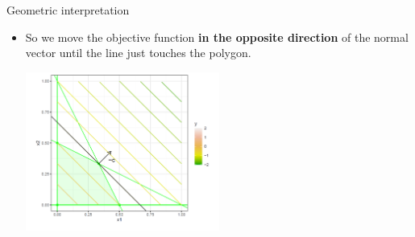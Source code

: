 \begin{vbframe}{Geometric interpretation}
\begin{itemize}




\framebreak
\item So we move the objective function \textbf{in the opposite direction} of the normal vector until the line just touches the polygon.

\begin{center}
\includegraphics[width = 0.5\textwidth]{figure_man/opposite-direction.png}
\end{center}







\end{itemize}

\end{vbframe}

